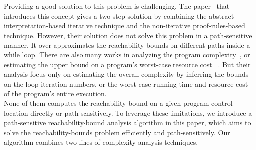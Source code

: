 Providing a good solution to this problem is challenging.
The paper~\cite{GulwaniZ10} that introduces this concept
gives a two-step solution by combining the abstract interpretation-based iterative technique
and the non-iterative proof-rules-based technique.
However, their solution
does not solve this problem in a path-sensitive manner.
It over-approximates the reachability-bounds on different paths inside a while loop.
There are also many works in analyzing the program complexity~\cite{GustafssonEL05, HumenbergerJK18},
or estimating the upper bound on a program's worst-case resource cost
~\cite{BrockschmidtEFFG16, AlbertAGP08, AliasDFG10, Flores-MontoyaH14}.
But their analysis
focus only on estimating 
the overall complexity 
by inferring the bounds on the loop iteration numbers,
or the worst-case running time and resource cost of the program's entire execution.
\\
None of them computes the reachability-bound on a given program control location directly or path-sensitively.
To leverage these limitations,
we introduce a path-sensitive reachability-bound analysis algorithm in this paper, which aims to solve 
the reachability-bounds problem efficiently and path-sensitively.
Our algorithm combines two lines of complexity analysis techniques.
